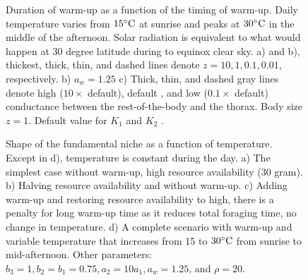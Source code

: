 \vspace{-1.5cm}
%
\begin{figure}[H]
\begin{center}
\caption{
	Duration of warm-up as a function of the timing of warm-up.
	Daily temperature varies from $15^{\circ}\rm{C}$ at sunrise and peaks at $30^{\circ}\rm{C}$ in the middle of the afternoon.
	Solar radiation is equivalent to what would happen at 30 degree latitude during to equinox clear sky.
	a) and b), thickest, thick, thin, and dashed lines denote  $z = 10, 1, 0.1, 0.01$,  respectively.
	b) $a_w = 1.25$
	c) Thick, thin, and dashed gray lines denote high ($10 \times $ default), default , and low ($0.1 \times$ default) conductance between the rest-of-the-body and the thorax. 
	Body size $z = 1$.
	Default value for $K_1$ and $K_2$ .	
}%
\label{fig4}
\end{center}
\end{figure}
\vspace{-1.5cm}
\begin{figure}[H]
\begin{center}
\caption{
	Shape of the fundamental niche as a function of temperature.
	Except in d),  temperature is constant during the day.
	a) The simplest case without warm-up, high resource availability (30 gram).
	b) Halving resource availability and without warm-up.
	c) Adding warm-up and  restoring resource availability to high, there is a penalty for long warm-up time as it reduces total foraging time, no change in temperature.
	d) A complete  scenario with warm-up and variable temperature that increases from 15 to $30^{\circ} \rm{C}$ from sunrise to mid-afternoon.
	Other parameters: $b_3 = 1, b_2 = b_1  = 0.75,  a_2 = 10 a_1, a_w = 1.25$, and  $\rho = 20$.
}%
\label{fig5}
\end{center}
\end{figure}
%